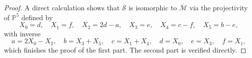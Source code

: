 \documentclass[a4paper,reqno]{amsart}
\numberwithin{equation}{section}
\newcommand{\C}{\mathbb{C}}
\newcommand{\p}{\mathbb{P}}
\numberwithin{equation}{section}
\begin{document}
\begin{proof}
    A direct calculation shows that $\overline{\mathcal{S}}$ is isomorphic to $\overline{\mathcal{M}}$ via the projectivity of $\p^5$ defined by
    \begin{equation} \label{eq:projectivityPI}
        X_0 =  d,\quad 
        X_1 = f, \quad 
        X_2 = 2 d-a, \quad 
        X_3 = e, \quad 
        X_4 = c-f, \quad 
        X_5 = b-e,
    \end{equation}
    with inverse 
    \begin{equation*}
        a= 2 X_0-X_2, \quad 
        b= X_3+X_5, \quad 
        c= X_1+X_4, \quad 
        d= X_0, \quad 
        e= X_3, \quad 
        f= X_1,
    \end{equation*}
    which finishes the proof of the first part.
    The second part is verified directly.
\end{proof}
\end{document}
